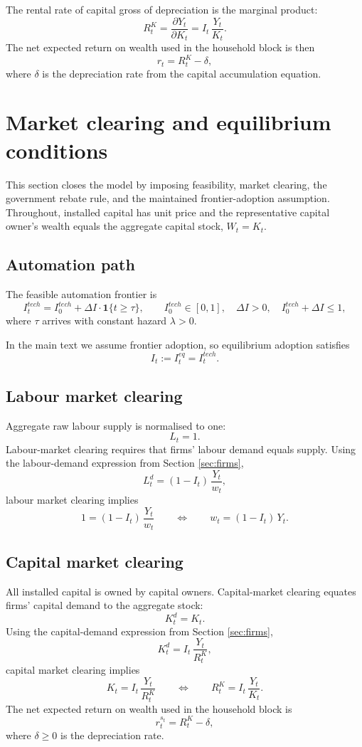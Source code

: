 \documentclass{article}
\begin{document}
The rental rate of capital gross of depreciation is the marginal product:
$$
R^K_t = \frac{\partial Y_t}{\partial K_t} = I_t\,\frac{Y_t}{K_t}.
$$
The net expected return on wealth used in the household block is then
$$
r_t = R^K_t - \delta,
$$
where $\delta$ is the depreciation rate from the capital accumulation equation.

\section{Market clearing and equilibrium conditions}
\label{sec:mc}

This section closes the model by imposing feasibility, market clearing, the government rebate rule, and the maintained frontier-adoption assumption. Throughout, installed capital has unit price and the representative capital owner's wealth equals the aggregate capital stock, $W_t = K_t$.

\subsection{Automation path}

The feasible automation frontier is
$$
I^{tech}_t = I^{tech}_0 + \Delta I \cdot \mathbf{1}\{t \ge \tau\},
\qquad I^{tech}_0 \in [0,1],\quad \Delta I>0,\quad I^{tech}_0+\Delta I \le 1,
$$
where $\tau$ arrives with constant hazard $\lambda>0$.

In the main text we assume frontier adoption, so equilibrium adoption satisfies
$$
I_t := I^{eq}_t = I^{tech}_t.
$$

\subsection{Labour market clearing}

Aggregate raw labour supply is normalised to one:
$$
L_t = 1.
$$
Labour-market clearing requires that firms' labour demand equals supply. Using the labour-demand expression from Section \ref{sec:firms},
$$
L_t^d = (1-I_t)\,\frac{Y_t}{w_t},
$$
labour market clearing implies
$$
1 = (1-I_t)\,\frac{Y_t}{w_t}
\qquad\Longleftrightarrow\qquad
w_t = (1-I_t)\,Y_t.
$$

\subsection{Capital market clearing}

All installed capital is owned by capital owners. Capital-market clearing equates firms' capital demand to the aggregate stock:
$$
K_t^d = K_t.
$$
Using the capital-demand expression from Section \ref{sec:firms},
$$
K_t^d = I_t\,\frac{Y_t}{R^K_t},
$$
capital market clearing implies
$$
K_t = I_t\,\frac{Y_t}{R^K_t}
\qquad\Longleftrightarrow\qquad
R^K_t = I_t\,\frac{Y_t}{K_t}.
$$
The net expected return on wealth used in the household block is
$$
r_t^{s_t} = R^K_t - \delta,
$$
where $\delta \ge 0$ is the depreciation rate.
\end{document}
